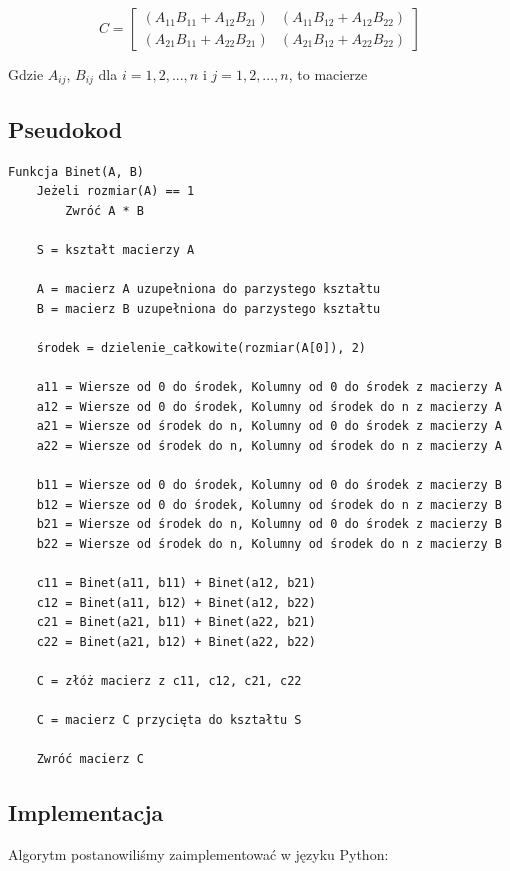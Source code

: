 \documentclass{article}
\begin{document}
\[
C =
\begin{bmatrix}
(A_{11}B_{11} + A_{12}B_{21}) & (A_{11}B_{12} + A_{12}B_{22}) \\
(A_{21}B_{11} + A_{22}B_{21}) & (A_{21}B_{12} + A_{22}B_{22})
\end{bmatrix}
\]

\bigbreak
\noindent
Gdzie \(A_{ij}\), \(B_{ij}\) dla \(i = {1, 2, ..., n}\) i \({j = {1, 2, ..., n}}\), to macierze


\subsection{Pseudokod}

\begin{verbatim}
Funkcja Binet(A, B)
    Jeżeli rozmiar(A) == 1
        Zwróć A * B

    S = kształt macierzy A

    A = macierz A uzupełniona do parzystego kształtu
    B = macierz B uzupełniona do parzystego kształtu

    środek = dzielenie_całkowite(rozmiar(A[0]), 2) 
    
    a11 = Wiersze od 0 do środek, Kolumny od 0 do środek z macierzy A
    a12 = Wiersze od 0 do środek, Kolumny od środek do n z macierzy A
    a21 = Wiersze od środek do n, Kolumny od 0 do środek z macierzy A
    a22 = Wiersze od środek do n, Kolumny od środek do n z macierzy A
    
    b11 = Wiersze od 0 do środek, Kolumny od 0 do środek z macierzy B
    b12 = Wiersze od 0 do środek, Kolumny od środek do n z macierzy B
    b21 = Wiersze od środek do n, Kolumny od 0 do środek z macierzy B
    b22 = Wiersze od środek do n, Kolumny od środek do n z macierzy B

    c11 = Binet(a11, b11) + Binet(a12, b21)
    c12 = Binet(a11, b12) + Binet(a12, b22)
    c21 = Binet(a21, b11) + Binet(a22, b21)
    c22 = Binet(a21, b12) + Binet(a22, b22)

    C = złóż macierz z c11, c12, c21, c22

    C = macierz C przycięta do kształtu S

    Zwróć macierz C
\end{verbatim}

\subsection{Implementacja}

Algorytm postanowiliśmy zaimplementować w języku Python:
\end{document}
